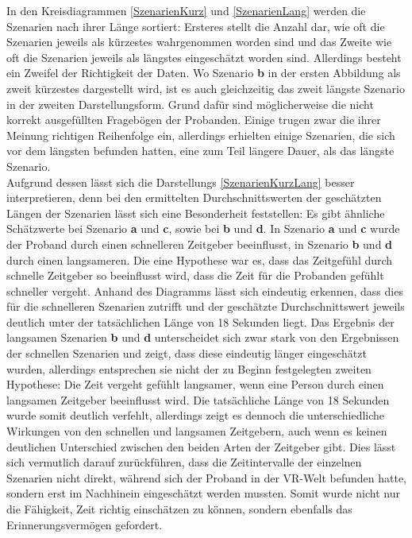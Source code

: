 \documentclass{Paper}
\begin{document}
In den Kreisdiagrammen \ref{SzenarienKurz} und \ref{SzenarienLang} werden die Szenarien nach ihrer Länge sortiert: Ersteres stellt die Anzahl dar, wie oft die Szenarien jeweils als kürzestes wahrgenommen worden sind und das Zweite wie oft die Szenarien jeweils als längstes eingeschätzt worden sind. Allerdings besteht ein Zweifel der Richtigkeit der Daten. Wo Szenario \textbf{b} in der ersten Abbildung als zweit kürzestes dargestellt wird, ist es auch gleichzeitig das zweit längste Szenario in der zweiten Darstellungsform. Grund dafür sind möglicherweise die nicht korrekt ausgefüllten Fragebögen der Probanden. Einige trugen zwar die ihrer Meinung richtigen Reihenfolge ein, allerdings erhielten einige Szenarien, die sich vor dem längsten befunden hatten, eine zum Teil längere Dauer, als das längste Szenario.\\ Aufgrund dessen lässt sich die Darstellungs \ref{SzenarienKurzLang} besser interpretieren, denn bei den ermittelten Durchschnittswerten der
geschätzten Längen der Szenarien lässt sich eine Besonderheit feststellen:
Es gibt ähnliche Schätzwerte bei Szenario \textbf{a} und \textbf{c}, sowie bei
\textbf{b} und \textbf{d}. In Szenario
\textbf{a} und \textbf{c} wurde der Proband durch einen schnelleren Zeitgeber
beeinflusst, in Szenario \textbf{b} und \textbf{d} durch einen langsameren.
Die eine Hypothese war es, dass das Zeitgefühl durch schnelle Zeitgeber so beeinflusst
wird, dass die Zeit für die Probanden gefühlt schneller vergeht. Anhand des
Diagramms lässt sich eindeutig erkennen, dass dies für die schnelleren Szenarien
zutrifft und der geschätzte Durchschnittswert jeweils deutlich unter der
tatsächlichen Länge von 18 Sekunden liegt. Das Ergebnis der langsamen Szenarien \textbf{b} und
\textbf{d} unterscheidet sich zwar stark von den Ergebnissen der schnellen
Szenarien und zeigt, dass diese eindeutig länger eingeschätzt wurden, allerdings
entsprechen sie nicht der zu Beginn festgelegten zweiten Hypothese: Die Zeit vergeht 
gefühlt langsamer, wenn eine Person durch einen langsamen Zeitgeber beeinflusst wird. Die
tatsächliche Länge von 18 Sekunden wurde somit deutlich verfehlt, allerdings zeigt es dennoch
die unterschiedliche Wirkungen von den schnellen und langsamen Zeitgebern, auch wenn es keinen
deutlichen Unterschied zwischen den beiden Arten der Zeitgeber gibt. Dies lässt sich vermutlich
darauf zurückführen, dass die Zeitintervalle der einzelnen Szenarien nicht direkt, während sich
der Proband in der VR-Welt befunden hatte, sondern erst im Nachhinein eingeschätzt werden mussten.
Somit wurde nicht nur die Fähigkeit, Zeit richtig einschätzen zu können, sondern
ebenfalls das Erinnerungsvermögen gefordert.
\end{document}
